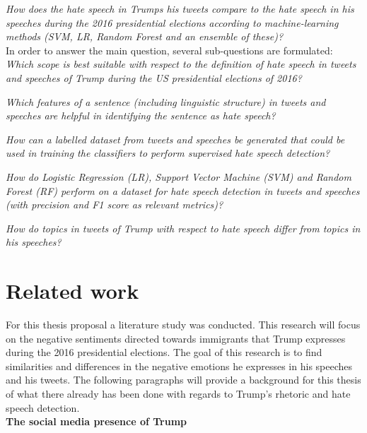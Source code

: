 \documentclass[a4paper,pdf]{article} %
\begin{document}
\emph{How does the hate speech in Trumps his tweets compare to the hate speech in his speeches during the 2016 presidential elections according to machine-learning methods (SVM, LR, Random Forest and an ensemble of these)?}\\

In order to answer the main question, several sub-questions are formulated: \\

\emph{Which scope is best suitable with respect to the definition of hate speech in tweets and speeches of Trump during the US presidential elections of 2016?}

\emph{Which features of a sentence (including linguistic structure) in tweets and speeches are helpful in identifying the sentence  as hate speech?}

\emph{How can a labelled dataset from tweets and speeches be generated that could be used in training the classifiers to perform supervised hate speech detection?}

\emph{How do Logistic Regression (LR), Support Vector Machine (SVM) and Random Forest (RF) perform on a dataset for hate speech detection in tweets and speeches (with precision and F1 score as relevant metrics)?}

\emph{How do topics in tweets of Trump with respect to hate speech differ from topics in his speeches?}

 \section{Related work}
 
For this thesis proposal a literature study was conducted. This research will focus on the negative sentiments directed towards immigrants that Trump expresses during the 2016 presidential elections. The goal of this research is to find similarities and differences in the negative emotions he expresses in his speeches and his tweets. The following paragraphs will provide a background for this thesis of what there already has been done with regards to Trump's rhetoric and hate speech detection.\\

\textbf{The social media presence of Trump}\\
\end{document}
